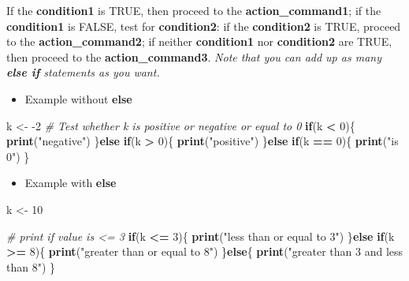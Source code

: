 \documentclass[]{book}
\newenvironment{Shaded}{\begin{snugshade}}{\end{snugshade}}
\newcommand{\CommentTok}[1]{\textcolor[rgb]{0.56,0.35,0.01}{\textit{#1}}}
\newcommand{\ControlFlowTok}[1]{\textcolor[rgb]{0.13,0.29,0.53}{\textbf{#1}}}
\newcommand{\DecValTok}[1]{\textcolor[rgb]{0.00,0.00,0.81}{#1}}
\newcommand{\KeywordTok}[1]{\textcolor[rgb]{0.13,0.29,0.53}{\textbf{#1}}}
\newcommand{\NormalTok}[1]{#1}
\newcommand{\OperatorTok}[1]{\textcolor[rgb]{0.81,0.36,0.00}{\textbf{#1}}}
\newcommand{\StringTok}[1]{\textcolor[rgb]{0.31,0.60,0.02}{#1}}
\providecommand{\tightlist}{%
  \setlength{\itemsep}{0pt}\setlength{\parskip}{0pt}}
\begin{document}
If the \textbf{condition1} is TRUE, then proceed to the \textbf{action\_command1}; if the \textbf{condition1} is FALSE, test for \textbf{condition2}: if the \textbf{condition2} is TRUE, proceed to the \textbf{action\_command2}; if neither \textbf{condition1} nor \textbf{condition2} are TRUE, then proceed to the \textbf{action\_command3}.
\emph{Note that you can add up as many \textbf{else if} statements as you want.}

\begin{itemize}
\tightlist
\item
  Example without \textbf{else}
\end{itemize}

\begin{Shaded}
\begin{Highlighting}[]
\NormalTok{k <-}\StringTok{ }\DecValTok{-2}
\CommentTok{# Test whether k is positive or negative or equal to 0}
\ControlFlowTok{if}\NormalTok{(k }\OperatorTok{<}\StringTok{ }\DecValTok{0}\NormalTok{)\{}
    \KeywordTok{print}\NormalTok{(}\StringTok{"negative"}\NormalTok{)}
\NormalTok{\}}\ControlFlowTok{else} \ControlFlowTok{if}\NormalTok{(k }\OperatorTok{>}\StringTok{ }\DecValTok{0}\NormalTok{)\{}
    \KeywordTok{print}\NormalTok{(}\StringTok{"positive"}\NormalTok{)}
\NormalTok{\}}\ControlFlowTok{else} \ControlFlowTok{if}\NormalTok{(k }\OperatorTok{==}\StringTok{ }\DecValTok{0}\NormalTok{)\{}
    \KeywordTok{print}\NormalTok{(}\StringTok{"is 0"}\NormalTok{)}
\NormalTok{\}}
\end{Highlighting}
\end{Shaded}

\begin{itemize}
\tightlist
\item
  Example with \textbf{else}
\end{itemize}

\begin{Shaded}
\begin{Highlighting}[]
\NormalTok{k <-}\StringTok{ }\DecValTok{10}

\CommentTok{# print if value is <= 3}
\ControlFlowTok{if}\NormalTok{(k }\OperatorTok{<=}\StringTok{ }\DecValTok{3}\NormalTok{)\{}
  \KeywordTok{print}\NormalTok{(}\StringTok{"less than or equal to 3"}\NormalTok{)}
\NormalTok{\}}\ControlFlowTok{else} \ControlFlowTok{if}\NormalTok{(k }\OperatorTok{>=}\StringTok{ }\DecValTok{8}\NormalTok{)\{}
  \KeywordTok{print}\NormalTok{(}\StringTok{"greater than or equal to 8"}\NormalTok{)}
\NormalTok{\}}\ControlFlowTok{else}\NormalTok{\{}
  \KeywordTok{print}\NormalTok{(}\StringTok{"greater than 3 and less than 8"}\NormalTok{)}
\NormalTok{\}}
\end{Highlighting}
\end{Shaded}
\end{document}
